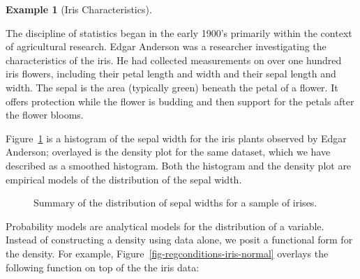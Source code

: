\documentclass[
  letterpaper,
  DIV=11,
  numbers=noendperiod]{scrreprt}
\theoremstyle{definition}
\theoremstyle{definition}
\newtheorem{example}{Example}[chapter]
\theoremstyle{plain}
\theoremstyle{remark}
\begin{document}
\begin{example}[Iris
Characteristics]\protect\hypertarget{exm-iris}{}\label{exm-iris}

The discipline of statistics began in the early 1900's primarily within
the context of agricultural research. Edgar Anderson was a researcher
investigating the characteristics of the iris. He had collected
measurements on over one hundred iris flowers, including their petal
length and width and their sepal length and width. The sepal is the area
(typically green) beneath the petal of a flower. It offers protection
while the flower is budding and then support for the petals after the
flower blooms.

\end{example}

Figure~\ref{fig-regconditions-iris-histogram} is a histogram of the
sepal width for the iris plants observed by Edgar Anderson; overlayed is
the density plot for the same dataset, which we have described as a
smoothed histogram. Both the histogram and the density plot are
empirical models of the distribution of the sepal width.

\begin{figure}


\caption{\label{fig-regconditions-iris-histogram}Summary of the
distribution of sepal widths for a sample of irises.}

\end{figure}%

Probability models are analytical models for the distribution of a
variable. Instead of constructing a density using data alone, we posit a
functional form for the density. For example,
Figure~\ref{fig-regconditions-iris-normal} overlays the following
function on top of the the iris data:
\end{document}
